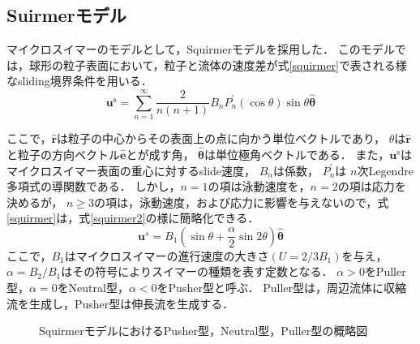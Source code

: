 \subsection{Suirmerモデル}
\par
マイクロスイマーのモデルとして，Squirmerモデル\cite{}を採用した．
このモデルでは，球形の粒子表面において，粒子と流体の速度差が式\eqref{squirmer}で表される様なsliding境界条件を用いる．
    \begin{equation}
        \boldsymbol{u}^\mathrm{s} = 
            \sum_{n=1}^\infty\frac{2}{n(n + 1)} B_n P_n^\prime(\cos{\theta}) \sin{\theta} \hat{\boldsymbol{\theta}}
        \label{squirmer}
    \end{equation}

\noindent
ここで，$\boldsymbol{\hat{r}}$は粒子の中心からその表面上の点に向かう単位ベクトルであり，
$\theta$は$\boldsymbol{\hat{r}}$と粒子の方向ベクトル$\boldsymbol{\hat{e}}$とが成す角，
$\boldsymbol{\hat{\theta}}$は単位極角ベクトルである．
また，$\boldsymbol{u}^\mathrm{s}$はマイクロスイマー表面の重心に対するslide速度，
$B_n$は係数，
$P^\prime_n$は $n$次Legendre多項式の導関数である．
しかし，$n=1$の項は泳動速度を，$n=2$の項は応力を決めるが，
$n \geq 3$の項は，泳動速度，および応力に影響を与えないので，式\eqref{squirmer}は，式\eqref{squirmer2}の様に簡略化できる．
    \begin{equation}
            \boldsymbol{u}^s =
                B_1\left(\sin{\theta} + \frac{\alpha}{2}\sin{2\theta}\right)\hat{\boldsymbol{\theta}}
        \label{squirmer2}
    \end{equation}
ここで，$B_1$はマイクロスイマーの進行速度の大きさ$(U = 2/3 B_1)$を与え，$\alpha = B_2/B_1$はその符号によりスイマーの種類を表す定数となる．
$\alpha > 0$をPuller型，$\alpha = 0$をNeutral型，$\alpha < 0$をPusher型と呼ぶ．
Puller型は，周辺流体に収縮流を生成し，Pusher型は伸長流を生成する．
    \begin{figure}[htbp]
        \label{squirmer_flow}
        \caption{SquirmerモデルにおけるPusher型，Neutral型，Puller型の概略図}
    \end{figure}

